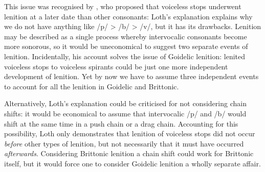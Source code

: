 This issue was recognised  by \textcite{loth_les_1892}, who proposed that voiceless stops underwent lenition at a later date than other consonants:
Loth's explanation explains why we do not have anything like /p/ > /b/ > /v/, but it has its drawbacks. Lenition may be described as a single process whereby intervocalic consonants become more sonorous, so it would be uneconomical to suggest two separate events of lenition. Incidentally, his account solves the issue of Goidelic lenition:  lenited voiceless stops to voiceless spirants could be just one more independent development of lenition. Yet by now we have to assume three independent events to account for all the lenition in Goidelic and Brittonic.

Alternatively, Loth's explanation could be criticised for not considering chain shifts: it would be economical to assume that intervocalic /p/ and /b/ would shift at the same time in a push chain or a drag chain. Accounting for this possibility, Loth only demonstrates  that lenition of voiceless stops did not  occur \emph{before} other types of lenition, but not necessarily that it must have occurred \emph{afterwards}. Considering Brittonic lenition a chain shift could work for Brittonic itself, but it would force one to consider Goidelic lenition a wholly separate affair.

